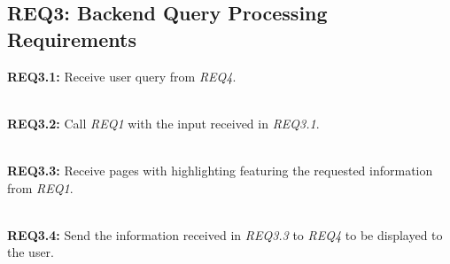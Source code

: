 \subsection{REQ3: Backend Query Processing Requirements}

\textbf{REQ3.1:} Receive user query from \textit{REQ4}.\par

\textbf{\\REQ3.2:} Call \textit{REQ1} with the input received in \textit{REQ3.1}.\par

\textbf{\\REQ3.3:} Receive pages with highlighting featuring the requested information from \textit{REQ1}.\par

\textbf{\\REQ3.4:} Send the information received in \textit{REQ3.3} to \textit{REQ4} to be displayed to the user.\par

